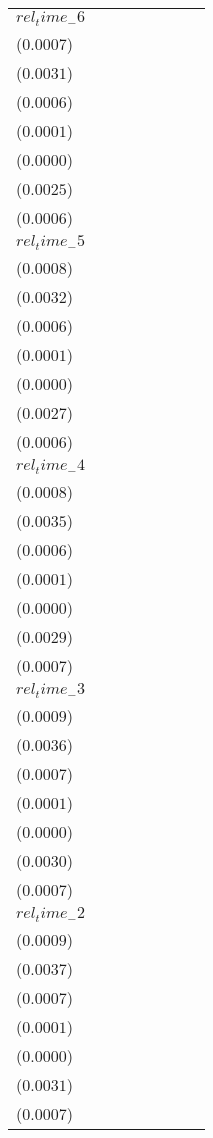 \begin{tabular}{llllllll}
$rel_time_-6$ & \makecell{$0.0007^{}$ \\ ($0.0007$)} & \makecell{$0.0028^{}$ \\ ($0.0031$)} & \makecell{$0.0041^{***}$ \\ ($0.0006$)} & \makecell{$0.0003^{***}$ \\ ($0.0001$)} & \makecell{$0.0001^{***}$ \\ ($0.0000$)} & \makecell{$0.0034^{}$ \\ ($0.0025$)} & \makecell{$0.0008^{}$ \\ ($0.0006$)} \\
$rel_time_-5$ & \makecell{$0.0004^{}$ \\ ($0.0008$)} & \makecell{$0.0016^{}$ \\ ($0.0032$)} & \makecell{$0.0036^{***}$ \\ ($0.0006$)} & \makecell{$0.0003^{***}$ \\ ($0.0001$)} & \makecell{$0.0001^{***}$ \\ ($0.0000$)} & \makecell{$0.0026^{}$ \\ ($0.0027$)} & \makecell{$0.0005^{}$ \\ ($0.0006$)} \\
$rel_time_-4$ & \makecell{$0.0004^{}$ \\ ($0.0008$)} & \makecell{$0.0018^{}$ \\ ($0.0035$)} & \makecell{$0.0020^{***}$ \\ ($0.0006$)} & \makecell{$0.0002^{**}$ \\ ($0.0001$)} & \makecell{$0.0001^{***}$ \\ ($0.0000$)} & \makecell{$0.0031^{}$ \\ ($0.0029$)} & \makecell{$0.0006^{}$ \\ ($0.0007$)} \\
$rel_time_-3$ & \makecell{$0.0012^{}$ \\ ($0.0009$)} & \makecell{$0.0046^{}$ \\ ($0.0036$)} & \makecell{$-0.0015^{**}$ \\ ($0.0007$)} & \makecell{$-0.0001^{}$ \\ ($0.0001$)} & \makecell{$-0.0000^{}$ \\ ($0.0000$)} & \makecell{$0.0033^{}$ \\ ($0.0030$)} & \makecell{$0.0006^{}$ \\ ($0.0007$)} \\
$rel_time_-2$ & \makecell{$0.0002^{}$ \\ ($0.0009$)} & \makecell{$-0.0000^{}$ \\ ($0.0037$)} & \makecell{$-0.0013^{*}$ \\ ($0.0007$)} & \makecell{$-0.0000^{}$ \\ ($0.0001$)} & \makecell{$-0.0000^{}$ \\ ($0.0000$)} & \makecell{$-0.0003^{}$ \\ ($0.0031$)} & \makecell{$-0.0003^{}$ \\ ($0.0007$)} \\

\end{tabular}
